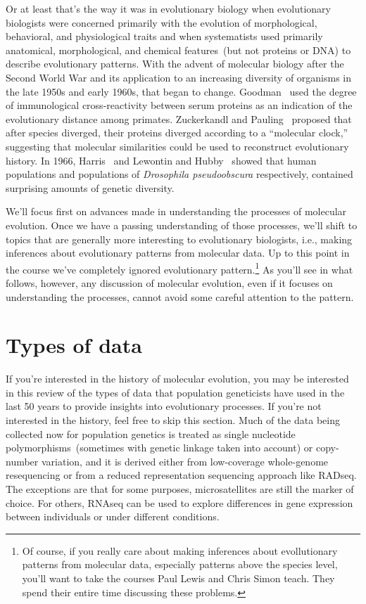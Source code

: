 Or at least that's the way it was in evolutionary biology when
evolutionary biologists were concerned primarily with the evolution of
morphological, behavioral, and physiological traits and when
systematists used primarily anatomical, morphological, and chemical
features~(but not proteins or DNA) to describe evolutionary
patterns. With the advent of molecular biology after the Second World
War and its application to an increasing diversity of organisms in the
late 1950s and early 1960s, that began to
change. Goodman~\cite{Goodman62} used the degree of immunological
cross-reactivity between serum proteins as an indication of the
evolutionary distance among primates. Zuckerkandl and
Pauling~\cite{Zuckerkandl-Pauling65} proposed that after species
diverged, their proteins diverged according to a ``molecular
clock,'' suggesting that molecular similarities
could be used to reconstruct evolutionary history. In 1966,
Harris~\cite{Harris66} and Lewontin and
Hubby~\cite{Hubby-Lewontin66,Lewontin-Hubby66} showed that human
populations and populations of {\it Drosophila pseudoobscura\/}
respectively, contained surprising amounts of genetic
diversity.

We'll focus first on advances made in understanding the processes of
molecular evolution. Once we have a passing understanding of those
processes, we'll shift to topics that are generally more interesting
to evolutionary biologists, i.e., making inferences about evolutionary
patterns from molecular data. Up to this point in the course we've
completely ignored evolutionary pattern.\footnote{Of course, if you
  really care about making inferences about evollutionary patterns
  from molecular data, especially patterns above the species level,
  you'll want to take the courses Paul Lewis and Chris Simon
  teach. They spend their entire time discussing these problems.}  As
you'll see in what follows, however, any discussion of molecular
evolution, even if it focuses on understanding the processes, cannot
avoid some careful attention to the pattern.

\section*{Types of data} 

If you're interested in the history of molecular evolution, you may be
interested in this review of the types of data that population
geneticists have used in the last 50 years to provide insights into
evolutionary processes. If you're not interested in the history, feel
free to skip this section. Much of the data being collected now for
population genetics is treated as single nucleotide
polymorphisms~(sometimes with genetic linkage taken into account) or
copy-number variation, and it is derived either from low-coverage
whole-genome resequencing or from a reduced representation sequencing
approach like RADseq. The exceptions are that for some purposes,
microsatellites are still the marker of choice. For others, RNAseq can
be used to explore differences in gene expression between individuals
or under different conditions.

